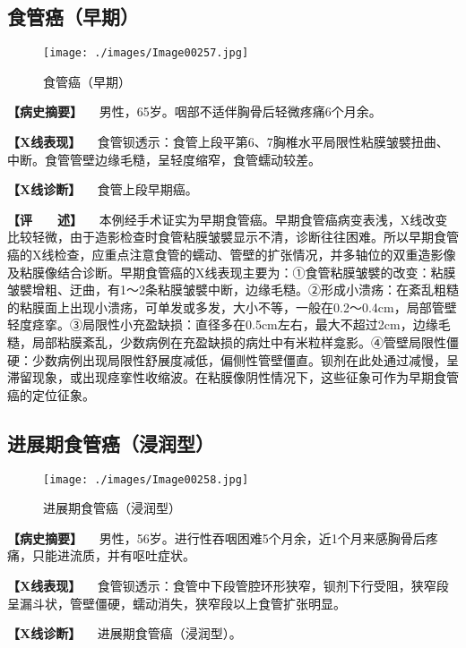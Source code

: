 \subsection{食管癌（早期）}

\begin{figure}[!htbp]
 \centering
 \texttt{[image: ./images/Image00257.jpg]}
 \captionsetup{justification=centering}
 \caption{食管癌（早期）}
 \label{fig5-2-14}
  \end{figure} 

\textbf{【病史摘要】} 　男性，65岁。咽部不适伴胸骨后轻微疼痛6个月余。

\textbf{【X线表现】}
　食管钡透示：食管上段平第6、7胸椎水平局限性粘膜皱襞扭曲、中断。食管管壁边缘毛糙，呈轻度缩窄，食管蠕动较差。

\textbf{【X线诊断】} 　食管上段早期癌。

\textbf{【评　　述】}
　本例经手术证实为早期食管癌。早期食管癌病变表浅，X线改变比较轻微，由于造影检查时食管粘膜皱襞显示不清，诊断往往困难。所以早期食管癌的X线检查，应重点注意食管的蠕动、管壁的扩张情况，并多轴位的双重造影像及粘膜像结合诊断。早期食管癌的X线表现主要为：①食管粘膜皱襞的改变：粘膜皱襞增粗、迂曲，有1～2条粘膜皱襞中断，边缘毛糙。②形成小溃疡：在紊乱粗糙的粘膜面上出现小溃疡，可单发或多发，大小不等，一般在0.2～0.4cm，局部管壁轻度痉挛。③局限性小充盈缺损：直径多在0.5cm左右，最大不超过2cm，边缘毛糙，局部粘膜紊乱，少数病例在充盈缺损的病灶中有米粒样龛影。④管壁局限性僵硬：少数病例出现局限性舒展度减低，偏侧性管壁僵直。钡剂在此处通过减慢，呈滞留现象，或出现痉挛性收缩波。在粘膜像阴性情况下，这些征象可作为早期食管癌的定位征象。

\subsection{进展期食管癌（浸润型）}

\begin{figure}[!htbp]
 \centering
 \texttt{[image: ./images/Image00258.jpg]}
 \captionsetup{justification=centering}
 \caption{进展期食管癌（浸润型）}
 \label{fig5-2-15}
  \end{figure} 

\textbf{【病史摘要】}
　男性，56岁。进行性吞咽困难5个月余，近1个月来感胸骨后疼痛，只能进流质，并有呕吐症状。

\textbf{【X线表现】}
　食管钡透示：食管中下段管腔环形狭窄，钡剂下行受阻，狭窄段呈漏斗状，管壁僵硬，蠕动消失，狭窄段以上食管扩张明显。

\textbf{【X线诊断】} 　进展期食管癌（浸润型）。

